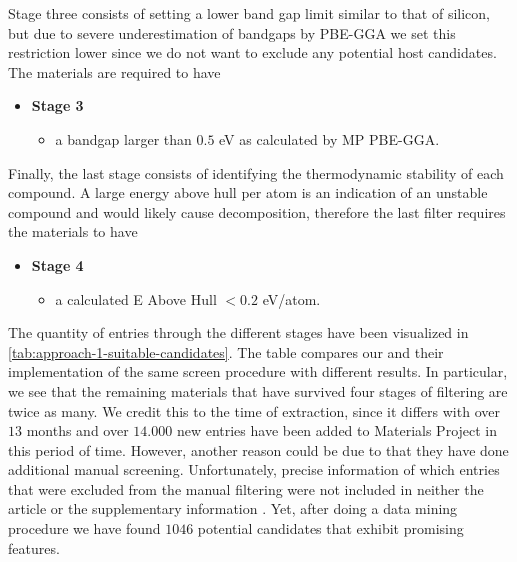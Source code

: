 \noindent Stage three consists of setting a lower band gap limit similar to that of silicon, but due to severe underestimation of bandgaps by PBE-GGA we set this restriction lower since we do not want to exclude any potential host candidates. The materials are required to have
\begin{itemize}
  \item[]{\textbf{Stage 3}}
  \begin{itemize}
  \item a bandgap larger than $0.5$ eV as calculated by MP PBE-GGA.
  \end{itemize}
\end{itemize}

\noindent Finally, the last stage consists of identifying the thermodynamic stability of each compound. A large energy above hull per atom is an indication of an unstable compound and would likely cause decomposition, therefore the last filter requires the materials to have

\begin{itemize}
  \item[]{\textbf{Stage 4}}
  \begin{itemize}
  \item a calculated E Above Hull $<0.2$ eV/atom.
  \end{itemize}
\end{itemize}

\noindent The quantity of entries through the different stages have been visualized in \autoref{tab:approach-1-suitable-candidates}. The table compares our and their implementation of the same screen procedure with different results. In particular, we see that the remaining materials that have survived four stages of filtering are twice as many. We credit this to the time of extraction, since it differs with over $13$ months and over $14.000$ new entries have been added to Materials Project in this period of time. However, another reason could be due to that they have done additional manual screening. Unfortunately, precise information of which entries that were excluded from the manual filtering were not included in neither the article or the supplementary information \cite{Ferrenti2020}. Yet, after doing a data mining procedure we have found $1046$ potential candidates that exhibit promising features.

